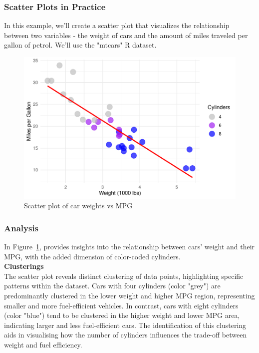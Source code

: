 \documentclass{article}\usepackage[]{graphicx}\usepackage[]{xcolor}
\makeatletter
\def\maxwidth{ %
  \ifdim\Gin@nat@width>\linewidth
    \linewidth
  \else
    \Gin@nat@width
  \fi
}
\newenvironment{kframe}{%
 \def\at@end@of@kframe{}%
 \ifinner\ifhmode%
  \def\at@end@of@kframe{\end{minipage}}%
  \begin{minipage}{\columnwidth}%
 \fi\fi%
 \def\FrameCommand##1{\hskip\@totalleftmargin \hskip-\fboxsep
 \colorbox{shadecolor}{##1}\hskip-\fboxsep
     \hskip-\linewidth \hskip-\@totalleftmargin \hskip\columnwidth}%
 \MakeFramed {\advance\hsize-\width
   \@totalleftmargin\z@ \linewidth\hsize
   \@setminipage}}%
 {\par\unskip\endMakeFramed%
 \at@end@of@kframe}
\newenvironment{knitrout}{}{} %
\makeatother
\begin{document}
\subsubsection{Scatter Plots in Practice}
In this example, we'll create a scatter plot that visualizes the relationship between two variables - the weight of cars and the amount of miles traveled per gallon of petrol. We'll use the "mtcars" R dataset.

\begin{knitrout}
\color{fgcolor}\begin{kframe}


{\ttfamily\noindent\itshape{}}\end{kframe}\begin{figure}
\includegraphics[width=\maxwidth]{figure/scatter-plot-1} \caption[Scatter plot of car weights vs MPG]{Scatter plot of car weights vs MPG}\label{fig:scatter-plot}
\end{figure}

\end{knitrout}

\subsubsection{Analysis}
In Figure~\ref{fig:scatter-plot}, provides insights into the relationship between cars' weight and their MPG, with the added dimension of color-coded cylinders.\\

\textbf{Clusterings}\\
The scatter plot reveals distinct clustering of data points, highlighting specific patterns within the dataset. Cars with four cylinders (color "grey") are predominantly clustered in the lower weight and higher MPG region, representing smaller and more fuel-efficient vehicles. In contrast, cars with eight cylinders (color "blue") tend to be clustered in the higher weight and lower MPG area, indicating larger and less fuel-efficient cars. The identification of this clustering aids in visualising how the number of cylinders influences the trade-off between weight and fuel efficiency.\\
\end{document}
